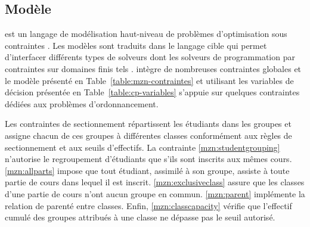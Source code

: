 \subsection{Modèle \MINIZINC{}}
\label{sec:model-minizinc}





{\MINIZINC} est un langage de modélisation haut-niveau de problèmes d'optimisation sous contraintes \cite{MZN,MINIZINC}. 
Les modèles {\MINIZINC} sont traduits dans le langage cible {\FLATZINC} \cite{FLATZINC} qui permet d'interfacer différents types de solveurs dont les solveurs de programmation par contraintes sur domaines finis tels  {\GECODE} \cite{GECODE}.
{\MINIZINC} intègre de nombreuses contraintes globales et le modèle {\UTP} présenté en Table~\ref{table:mzn-contraintes} et utilisant les variables de décision présentée en Table~\ref{table:cp-variables} s'appuie sur quelques contraintes dédiées aux problèmes d'ordonnancement.

Les contraintes de sectionnement répartissent
les étudiants dans les groupes et assigne chacun de ces groupes à différentes classes 
conformément aux règles de sectionnement et aux seuils d'effectifs.
La contrainte \ref{mzn:studentgrouping} n'autorise le regroupement
d'étudiants que s'ils sont inscrits aux mêmes cours.
\ref{mzn:allparts} impose que tout étudiant, assimilé à son groupe, assiste à toute partie de cours dans lequel il est inscrit.
\ref{mzn:exclusiveclass} assure que les classes d'une partie de cours n'ont aucun groupe en commun.
\ref{mzn:parent} implémente la relation de parenté entre classes.
Enfin, \ref{mzn:classcapacity} vérifie que l'effectif cumulé des groupes attribués à une classe ne dépasse pas le seuil autorisé. 

